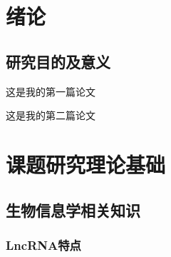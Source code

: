 \section{绪论}
\subsection{研究目的及意义}


这是我的第一篇论文\cite{xuan_dynamic_2022}

这是我的第二篇论文\cite{10.1093/bib/bbac009}

\pagebreak

\section{课题研究理论基础}
\subsection{生物信息学相关知识}
\subsubsection{LncRNA特点}

